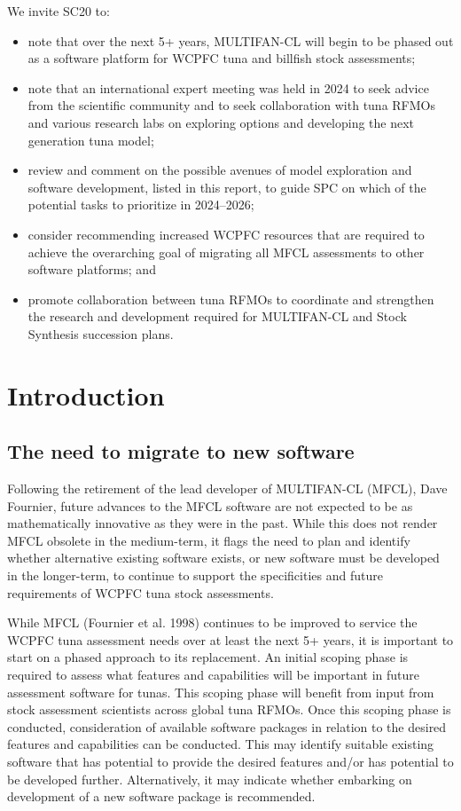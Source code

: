\documentclass{SCreport}
\begin{document}
\newpage

We invite SC20 to:

\begin{itemize}
  \item note that over the next 5+ years, MULTIFAN-CL will begin to be phased
  out as a software platform for WCPFC tuna and billfish stock assessments;
  \item note that an international expert meeting was held in 2024 to seek
  advice from the scientific community and to seek collaboration with tuna RFMOs
  and various research labs on exploring options and developing the next
  generation tuna model;
  \item review and comment on the possible avenues of model exploration and
  software development, listed in this report, to guide SPC on which of the
  potential tasks to prioritize in 2024--2026;
  \item consider recommending increased WCPFC resources that are required to
  achieve the overarching goal of migrating all MFCL assessments to other
  software platforms; and
  \item promote collaboration between tuna RFMOs to coordinate and strengthen
  the research and development required for MULTIFAN-CL and Stock Synthesis
  succession plans.
\end{itemize}

\section{Introduction}

\subsection{The need to migrate to new software}

Following the retirement of the lead developer of MULTIFAN-CL (MFCL), Dave
Fournier, future advances to the MFCL software are not expected to be as
mathematically innovative as they were in the past. While this does not render
MFCL obsolete in the medium-term, it flags the need to plan and identify whether
alternative existing software exists, or new software must be developed in the
longer-term, to continue to support the specificities and future requirements of
WCPFC tuna stock assessments.

While MFCL (Fournier et al. 1998) continues to be improved to service the WCPFC
tuna assessment needs over at least the next 5+ years, it is important to start
on a phased approach to its replacement. An initial scoping phase is required to
assess what features and capabilities will be important in future assessment
software for tunas. This scoping phase will benefit from input from stock
assessment scientists across global tuna RFMOs. Once this scoping phase is
conducted, consideration of available software packages in relation to the
desired features and capabilities can be conducted. This may identify suitable
existing software that has potential to provide the desired features and/or has
potential to be developed further. Alternatively, it may indicate whether
embarking on development of a new software package is recommended.
\end{document}
